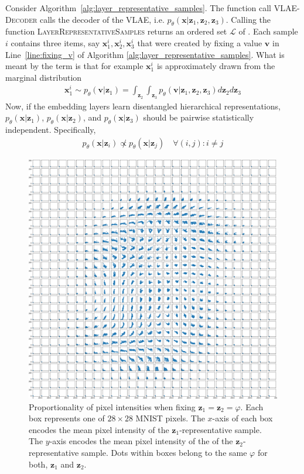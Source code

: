Consider Algorithm~\ref{alg:layer_representative_samples}.
The function call \textsc{VLAE-Decoder} calls the decoder of the VLAE, i.e. $p_\theta(\bm{x} | \bm{z}_1, \bm{z}_2, \bm{z}_3)$.
Calling the function \textsc{LayerRepresentativeSamples} returns an ordered set $\mathcal{L}$ of .
Each sample $i$ contains three items, say $\bm{x}_1^i, \bm{x}_2^i, \bm{x}_3^i$ that were created by fixing a value $\bm{v}$ in Line~\ref{line:fixing_v} of Algorithm \ref{alg:layer_representative_samples}.
What is meant by the term  is that for example $\bm{x}_1^i$ is approximately drawn from the marginal distribution
\begin{align}
    \bm{x}_1^i \sim p_\theta(\bm{v} | \bm{z}_1) = \int_{\bm{z}_2} \int_{\bm{z}_3} p_\theta(\bm{v} | \bm{z}_1, \bm{z}_2, \bm{z}_3) d\bm{z}_2 d\bm{z}_3
\end{align}
Now, if the embedding layers learn disentangled hierarchical representations, $p_\theta(\bm{x} | \bm{z}_1)$, $p_\theta(\bm{x} | \bm{z}_2)$, and $p_\theta(\bm{x} | \bm{z}_3)$ should be pairwise statistically independent.
Specifically,
\begin{align}
    p_\theta(\bm{x} | \bm{z}_i) \not \propto p_\theta(\bm{x} | \bm{z}_j) \quad \forall (i,j):i\neq j \label{eq:notprop}
\end{align}

\begin{figure}
    \centering
    \includegraphics[width=\textwidth]{images/notprop.png}
    \caption{Proportionality of pixel intensities when fixing $\bm{z}_1 = \bm{z}_2=\varphi$. Each box represents one of $28\times 28$ MNIST pixels. The $x$-axis of each box encodes the mean pixel intensity of the $\bm{z}_1$-representative sample. The $y$-axis encodes the mean pixel intensity of the of the $\bm{z}_2$-representative sample. Dots within boxes belong to the same $\varphi$ for both, $\bm{z}_1$ and $\bm{z}_2$. }
    \label{fig:notprop}
\end{figure}

